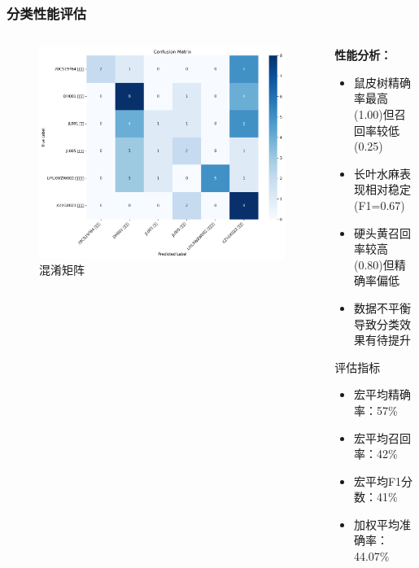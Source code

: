 \documentclass[12pt]{beamer}
\begin{document}
\begin{frame}
\frametitle{分类性能评估}
\begin{columns}
\begin{column}{0.5\textwidth}
\begin{figure}
\centering
\includegraphics[width=\textwidth]{confusion_matrix.png}
\caption{混淆矩阵}
\end{figure}
\end{column}

\begin{column}{0.5\textwidth}
\textbf{性能分析：}
\begin{itemize}
    \item 鼠皮树精确率最高(1.00)但召回率较低(0.25)
    \item 长叶水麻表现相对稳定(F1=0.67)
    \item 硬头黄召回率较高(0.80)但精确率偏低
    \item 数据不平衡导致分类效果有待提升
\end{itemize}

\vspace{0.3cm}
\begin{block}{评估指标}
\small
\begin{itemize}
    \item 宏平均精确率：57\%
    \item 宏平均召回率：42\%
    \item 宏平均F1分数：41\%
    \item 加权平均准确率：44.07\%
\end{itemize}
\end{block}
\end{column}
\end{columns}
\end{frame}
\end{document}
